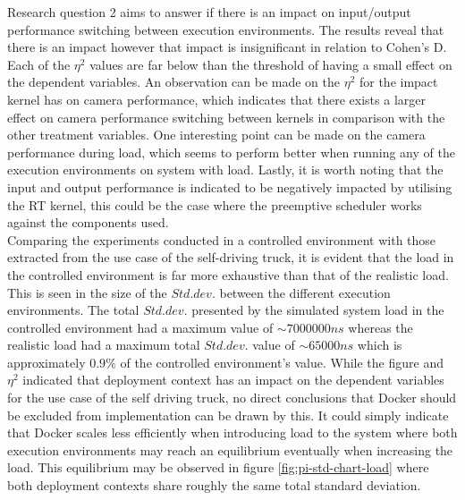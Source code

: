 Research question 2 aims to answer if there is an impact on input/output performance switching between execution environments. The results reveal that there is an impact however that impact is insignificant in relation to Cohen's D. Each of the $\eta^{2}$ values are far below than the threshold of having a small effect on the dependent variables. An observation can be made on the $\eta^{2}$ for the impact kernel has on camera performance, which indicates that there exists a larger effect on camera performance switching between kernels in comparison with the other treatment variables. One interesting point can be made on the camera performance during load, which seems to perform better when running any of the execution environments on system with load. Lastly, it is worth noting that the input and output performance is indicated to be negatively impacted by utilising the RT kernel, this could be the case where the preemptive scheduler works against the components used.\\

Comparing the experiments conducted in a controlled environment with those extracted from the use case of the self-driving truck, it is evident that the load in the controlled environment is far more exhaustive than that of the realistic load. This is seen in the size of the $Std.dev.$ between the different execution environments. The total $Std.dev.$ presented by the simulated system load in the controlled environment had a maximum value of $\sim7000000ns$ whereas the realistic load had a maximum total $Std.dev.$ value of $\sim65000ns$ which is approximately $0.9\%$ of the controlled environment's value. While the figure and $\eta^{2}$ indicated that deployment context has an impact on the dependent variables for the use case of the self driving truck, no direct conclusions that Docker should be excluded from implementation can be drawn by this. It could simply indicate that Docker scales less efficiently when introducing load to the system where both execution environments may reach an equilibrium eventually when increasing the load. This equilibrium may be observed in figure \ref{fig:pi-std-chart-load} where both deployment contexts share roughly the same total standard deviation.\\

